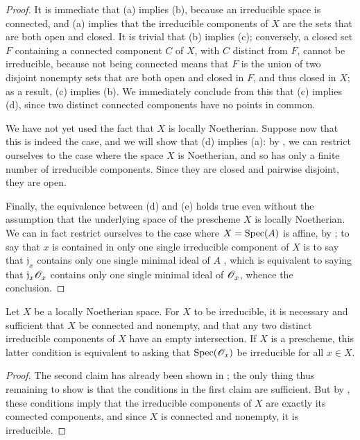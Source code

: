 \begin{proof}
\label{proof-1.6.1.10}
It is immediate that (a) implies (b), because an irreducible space is connected, and (a) implies that the irreducible components of $X$ are the sets that are both open and closed.
It is trivial that (b) implies (c); conversely, a closed set $F$ containing
a connected component $C$ of $X$, with $C$ distinct from $F$, cannot be irreducible, because not being connected means that $F$ is the union of two disjoint nonempty sets that are both open and closed in $F$, and thus closed in $X$; as a result, (c) implies (b).
We immediately conclude from this that (c) implies (d), since two distinct connected components have no points in common.

We have not yet used the fact that $X$ is locally Noetherian.
Suppose now that this is indeed the case, and we will show that (d) implies (a): by , we can restrict ourselves to the case where the space $X$ is Noetherian, and so has only a finite number of irreducible components.
Since they are closed and pairwise disjoint, they are open.

Finally, the equivalence between (d) and (e) holds true even without the assumption that the underlying space of the prescheme $X$ is locally Noetherian.
We can in fact restrict ourselves to the case where $X=\operatorname{Spec}(A)$ is affine, by ;
to say that $x$ is contained in only one single irreducible component of $X$ is to say that $\mathfrak{j}_x$ contains only one single minimal ideal of $A$ , which is equivalent to saying that $\mathfrak{j}_x\mathscr{O}_x$ contains only one single minimal ideal of $\mathscr{O}_x$, whence the conclusion.
\end{proof}

\begin{corollary}[6.1.11]
\label{I.6.1.11}
Let $X$ be a locally Noetherian space.
For $X$ to be irreducible, it is necessary and sufficient that $X$ be connected and nonempty, and that any two distinct irreducible components of $X$ have an empty intersection.
If $X$ is a prescheme, this latter condition is equivalent to asking that $\operatorname{Spec}(\mathscr{O}_x)$ be irreducible for all $x\in X$.
\end{corollary}

\begin{proof}
\label{proof-1.6.1.11}
The second claim has already been shown in ;
the only thing thus remaining to show is that the conditions in the first claim are sufficient.
But by , these conditions imply that the irreducible components of $X$ are exactly its connected components, and since $X$ is connected and nonempty, it is irreducible.
\end{proof}

